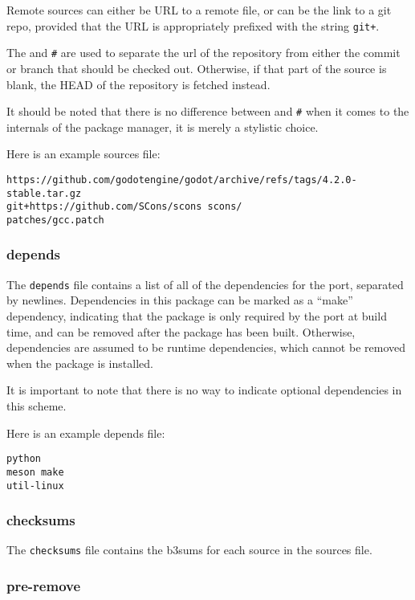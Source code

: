 \documentclass{article}
\begin{document}
Remote sources can either be URL to a remote file, or can be the link
to a git repo, provided that the URL is appropriately prefixed with the
string \texttt{git+}.

The \texttt{\@} and \texttt{\#} are used to separate the url of the repository
from either the commit or branch that should be checked out. Otherwise, if
that part of the source is blank, the HEAD of the repository is fetched instead.

It should be noted that there is no difference between \texttt{\@} and \texttt{\#}
when it comes to the internals of the package manager, it is merely a stylistic
choice.

Here is an example sources file:

\begin{verbatim}
https://github.com/godotengine/godot/archive/refs/tags/4.2.0-stable.tar.gz
git+https://github.com/SCons/scons scons/
patches/gcc.patch
\end{verbatim}

\subsubsection{depends}

The \texttt{depends} file contains a list of all of the dependencies for
the port, separated by newlines. Dependencies in this package can be marked
as a ``make'' dependency, indicating that the package is only required by
the port at build time, and can be removed after the package has been built.
Otherwise, dependencies are assumed to be runtime dependencies, which cannot
be removed when the package is installed.

It is important to note that there is no way to indicate optional dependencies
in this scheme.

Here is an example depends file:
\begin{verbatim}
python
meson make
util-linux
\end{verbatim}

\subsubsection{checksums}

The \texttt{checksums} file contains the b3sums for each source in the
sources file.

\subsubsection{pre-remove}
\end{document}
